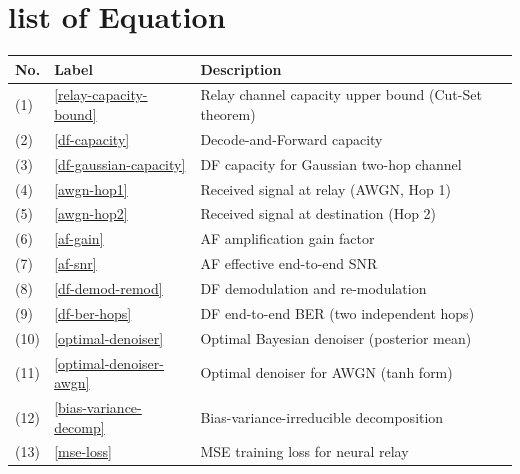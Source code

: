 \chapter*{list of Equation}\label{sec:equation-reference}

{\def\LTcaptype{table} %
\begin{longtable}[]{@{}
  >{\raggedright\arraybackslash}p{}
  >{\raggedright\arraybackslash}p{}
  >{\raggedright\arraybackslash}p{}@{}}
\toprule\noalign{}
\begin{minipage}[b]{\linewidth}\raggedright
No.
\end{minipage} & \begin{minipage}[b]{\linewidth}\raggedright
Label
\end{minipage} & \begin{minipage}[b]{\linewidth}\raggedright
Description
\end{minipage} \\
\midrule\noalign{}
\endhead
\bottomrule\noalign{}
\endlastfoot
(1) & \eqref{relay-capacity-bound} & Relay channel capacity upper bound (Cut-Set theorem) \\
(2) & \eqref{df-capacity} & Decode-and-Forward capacity \\
(3) & \eqref{df-gaussian-capacity} & DF capacity for Gaussian two-hop channel \\
(4) & \eqref{awgn-hop1} & Received signal at relay (AWGN, Hop 1) \\
(5) & \eqref{awgn-hop2} & Received signal at destination (Hop 2) \\
(6) & \eqref{af-gain} & AF amplification gain factor \\
(7) & \eqref{af-snr} & AF effective end-to-end SNR \\
(8) & \eqref{df-demod-remod} & DF demodulation and re-modulation \\
(9) & \eqref{df-ber-hops} & DF end-to-end BER (two independent hops) \\
(10) & \eqref{optimal-denoiser} & Optimal Bayesian denoiser (posterior mean) \\
(11) & \eqref{optimal-denoiser-awgn} & Optimal denoiser for AWGN (tanh form) \\
(12) & \eqref{bias-variance-decomp} & Bias-variance-irreducible decomposition \\
(13) & \eqref{mse-loss} & MSE training loss for neural relay \\

\end{longtable}}
